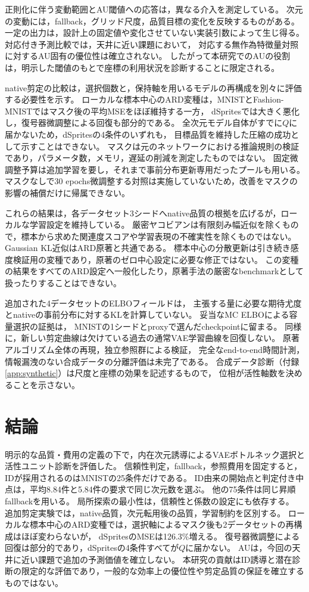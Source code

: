 \documentclass[11pt,a4paper]{ltjsarticle}
\begin{document}
正則化に伴う変動範囲とAU閾値への応答は，異なる介入を測定している。
次元の変動には，fallback，グリッド尺度，品質目標の変化を反映するものがある。
一定の出力は，設計上の固定値や変化させていない実装引数によって生じ得る。
対応付き予測比較では，天井に近い課題において，
対応する無作為特徴量対照に対するAU固有の優位性は確立されない。
したがって本研究でのAUの役割は，明示した閾値のもとで座標の利用状況を診断することに限定される。

native剪定の比較は，選択個数と，保持軸を用いるモデルの再構成を別々に評価する必要性を示す。
ローカルな標本中心のARD変種は，MNISTとFashion-MNISTではマスク後の平均MSEをほぼ維持する一方，
dSpritesでは大きく悪化し，復号器微調整による回復も部分的である。
全次元モデル自体がすでに$Q$に届かないため，dSpritesの4条件のいずれも，
目標品質を維持した圧縮の成功として示すことはできない。
マスクは元のネットワークにおける推論規則の検証であり，パラメータ数，メモリ，遅延の削減を測定したものではない。
固定微調整予算は追加学習を要し，それまで事前分布更新専用だったプールも用いる。
マスクなしで30 epochs微調整する対照は実施していないため，改善をマスクの影響の補償だけに帰属できない。

これらの結果は，各データセット3シードへnative品質の根拠を広げるが，ローカルな学習設定を維持している。
厳密ヤコビアンは有限刻み幅近似を除くもので，標本から求めた関連度スコアや学習表現の不確実性を除くものではない。
Gaussian KL近似はARD原著と共通である。
標本中心の分散更新は引き続き感度検証用の変種であり，原著のゼロ中心設定に必要な修正ではない。
この変種の結果をすべてのARD設定へ一般化したり，原著手法の厳密なbenchmarkとして扱ったりすることはできない。

追加された4データセットのELBOフィールドは，
主張する量に必要な期待尤度とnativeの事前分布に対するKLを計算していない。
妥当なMC ELBOによる容量選択の証拠は，
MNISTの1シードとproxyで選んだcheckpointに留まる。
同様に，新しい剪定曲線は欠けている過去の通常VAE学習曲線を回復しない。
原著アルゴリズム全体の再現，独立参照群による検証，
完全なend-to-end時間計測，情報漏洩のない合成データの分離評価は未完了である。
合成データ診断（付録\ref{app:synthetic}）は尺度と座標の効果を記述するもので，
位相が活性軸数を決めることを示さない。

\section{結論}\label{sec:conclusion}
明示的な品質・費用の定義の下で，内在次元誘導によるVAEボトルネック選択と活性ユニット診断を評価した。
信頼性判定，fallback，参照費用を固定すると，IDが採用されるのはMNISTの25条件だけである。
ID由来の開始点と判定付き中点は，平均8.84件と5.84件の要求で同じ次元数を選ぶ。
他の75条件は同じ昇順fallbackを用いる。
局所探索の最小性は，信頼性と係数の設定にも依存する。
追加剪定実験では，native品質，次元転用後の品質，学習制約を区別する。
ローカルな標本中心のARD変種では，選択軸によるマスク後も2データセットの再構成はほぼ変わらないが，
dSpritesのMSEは126.3\%増える。
復号器微調整による回復は部分的であり，dSpritesの4条件すべてが$Q$に届かない。
AUは，今回の天井に近い課題で追加の予測価値を確立しない。
本研究の貢献はID誘導と潜在診断の限定的な評価であり，一般的な効率上の優位性や剪定品質の保証を確立するものではない。
\end{document}
